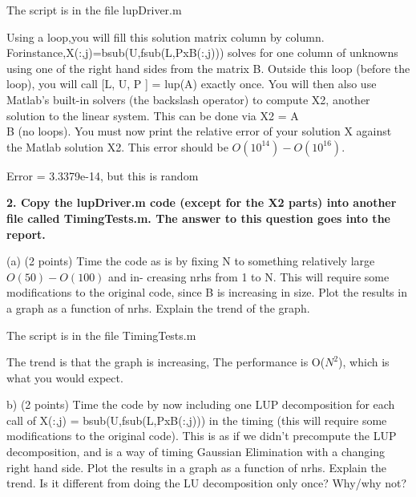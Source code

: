 \documentclass{report}
\begin{document}
\begin{flushleft}
The script is in the file lupDriver.m
\end{flushleft}

\begin{flushleft}
Using a loop,you will fill this solution matrix column by column. Forinstance,X(:,j)=bsub(U,fsub(L,PxB(:,j))) solves for one column of unknowns using one of the right hand sides from the matrix B. Outside this loop (before the loop), you will call [L, U, P ] = lup(A) exactly once. You will then also use Matlab’s built-in solvers (the backslash operator) to compute X2, another solution to the linear system. This can be done via X2 = A\\B (no loops). You must now print the relative error of your solution X against the Matlab solution X2. This error should be $O(10^{14})-O(10^{16})$.
\end{flushleft}

\begin{flushleft}
Error = 3.3379e-14, but this is random
\end{flushleft}

\begin{flushleft}
\textbf{2. Copy the lupDriver.m code (except for the X2 parts) into another file called TimingTests.m. The answer to this question goes into the report.}
\end{flushleft}

\begin{flushleft}
(a) (2 points) Time the code as is by fixing N to something relatively large $O(50)-O(100)$ and in- creasing nrhs from 1 to N. This will require some modifications to the original code, since B is increasing in size. Plot the results in a graph as a function of nrhs. Explain the trend of the graph.
\end{flushleft}

\begin{flushleft}
The script is in the file TimingTests.m

The trend is that the graph is increasing, The performance is O($N^2$), which is what you would expect.
\end{flushleft}

\begin{flushleft}
b) (2 points) Time the code by now including one LUP decomposition for each call of X(:,j) = bsub(U,fsub(L,PxB(:,j))) in the timing (this will require some modifications to the original code). This is as if we didn’t precompute the LUP decomposition, and is a way of timing Gaussian Elimination with a changing right hand side. Plot the results in a graph as a function of nrhs. Explain the trend. Is it different from doing the LU decomposition only once? Why/why not?
\end{flushleft}
\end{document}
